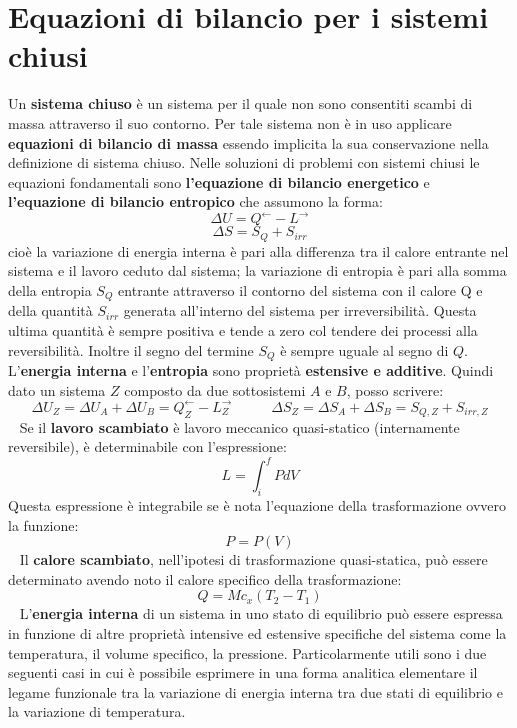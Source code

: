 \section{Equazioni di bilancio per i sistemi chiusi}
Un \textbf{sistema chiuso} è un sistema per il quale non sono consentiti scambi di massa attraverso il suo contorno. Per tale sistema non è in uso applicare \textbf{equazioni di bilancio di massa} essendo implicita la sua conservazione nella definizione di sistema chiuso.\newline
\newline
Nelle soluzioni di problemi con sistemi chiusi le equazioni fondamentali sono \textbf{l'equazione di bilancio energetico} e \textbf{l'equazione di bilancio entropico} che assumono la forma:
\[
    \Delta U = Q^\leftarrow  -L^\rightarrow  
\]
\[
    \Delta S = S_Q + S_{irr}
\]
cioè la variazione di energia interna è pari alla differenza tra il calore entrante nel sistema e il lavoro ceduto dal sistema; la variazione di entropia è pari alla somma della entropia $S_Q$ entrante attraverso il contorno del sistema con il calore Q e della quantità $S_{irr}$ generata all'interno del sistema per irreversibilità. Questa ultima quantità è sempre positiva e tende a zero col tendere dei processi alla reversibilità. Inoltre il segno del termine $S_Q$ è sempre uguale al segno di $Q$.\newline
\newline
L'\textbf{energia interna} e l'\textbf{entropia} sono proprietà \textbf{estensive e additive}. Quindi dato un sistema $Z$ composto da due sottosistemi $A$ e $B$, posso scrivere:
\[
    \Delta U_Z = \Delta U_A + \Delta U_B = Q_Z^\leftarrow  - L_Z^\rightarrow  \;\;\;\;\;\;\;\;\;\;\Delta S_Z = \Delta S_A + \Delta S_B = S_{Q,Z} + S_{irr,Z}
\]
\ \newline
\newline
Se il \textbf{lavoro scambiato} è lavoro meccanico quasi-statico (internamente reversibile), è determinabile con l'espressione:
\[
    L = \int_{i}^{f} P dV
\]
Questa espressione è integrabile se è nota l'equazione della trasformazione ovvero la funzione:
\[
    P = P(V)
\]
\ \newline
Il \textbf{calore scambiato}, nell'ipotesi di trasformazione quasi-statica, può essere determinato avendo noto il calore specifico della trasformazione:
\[
    Q = M c_x (T_2-T_1)
\]
\ \newline
L'\textbf{energia interna} di un sistema in uno stato di equilibrio può essere espressa in funzione di altre proprietà intensive ed estensive specifiche del sistema come la temperatura, il volume specifico, la pressione. Particolarmente utili sono i due seguenti casi in cui è possibile esprimere in una forma analitica elementare il legame funzionale tra la variazione di energia interna tra due stati di equilibrio e la variazione di temperatura. \newline
